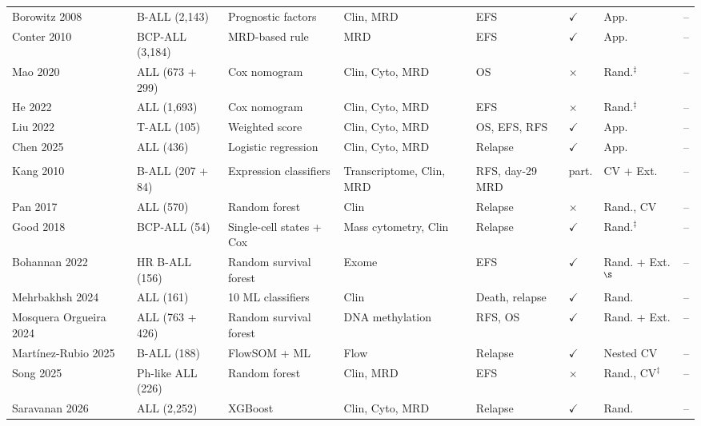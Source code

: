 \documentclass[pdflatex,sn-nature]{sn-jnl}
\begin{document}
\begin{appendices}
\begin{table}
\begin{tabular}{@{}llllllll@{}}
Borowitz 2008~\cite{[CITE:Borowitz2008]} & B-ALL (2,143) & Prognostic factors & Clin, MRD & EFS & $\checkmark$ & App. & -- \\
Conter 2010~\cite{[CITE:Conter2010]} & BCP-ALL (3,184) & MRD-based rule & MRD & EFS & $\checkmark$ & App. & -- \\
Mao 2020~\cite{[CITE:Mao2020]} & ALL (673 + 299) & Cox nomogram & Clin, Cyto, MRD & OS & $\times$ & Rand.$^\ddagger$ & -- \\
He 2022~\cite{[CITE:He2022]} & ALL (1,693) & Cox nomogram & Clin, Cyto, MRD & EFS & $\times$ & Rand.$^\ddagger$ & -- \\
Liu 2022~\cite{[CITE:Liu2022TALL]} & T-ALL (105) & Weighted score & Clin, Cyto, MRD & OS, EFS, RFS & $\checkmark$ & App. & -- \\
Chen 2025~\cite{[CITE:Chen2025FrontPediatr]} & ALL (436) & Logistic regression & Clin, Cyto, MRD & Relapse & $\checkmark$ & App. & -- \\
\addlinespace[2pt]
\multicolumn{8}{@{}l}{\textit{Paediatric ALL: machine-learning and omics models}} \\
Kang 2010~\cite{[CITE:Kang2010]} & B-ALL (207 + 84) & Expression classifiers & Transcriptome, Clin, MRD & RFS, day-29 MRD & part. & CV + Ext. & -- \\
Pan 2017~\cite{[CITE:Pan2017]} & ALL (570) & Random forest & Clin & Relapse & $\times$ & Rand., CV & -- \\
Good 2018~\cite{[CITE:Good2018]} & BCP-ALL (54) & Single-cell states + Cox & Mass cytometry, Clin & Relapse & $\checkmark$ & Rand.$^\ddagger$ & -- \\
Bohannan 2022~\cite{[CITE:Bohannan2022]} & HR B-ALL (156) & Random survival forest & Exome & EFS & $\checkmark$ & Rand. + Ext.$^\S$ & -- \\
Mehrbakhsh 2024~\cite{[CITE:Mehrbakhsh2024]} & ALL (161) & 10 ML classifiers & Clin & Death, relapse & $\checkmark$ & Rand. & -- \\
Mosquera Orgueira 2024~\cite{[CITE:Mosquera2024]} & ALL (763 + 426) & Random survival forest & DNA methylation & RFS, OS & $\checkmark$ & Rand. + Ext. & -- \\
Mart\'inez-Rubio 2025~\cite{[CITE:Martinez2025]} & B-ALL (188) & FlowSOM + ML & Flow & Relapse & $\checkmark$ & Nested CV & -- \\
Song 2025~\cite{[CITE:Song2025]} & Ph-like ALL (226) & Random forest & Clin, MRD & EFS & $\times$ & Rand., CV$^\ddagger$ & -- \\
Saravanan 2026~\cite{[CITE:Saravanan2026]} & ALL (2,252) & XGBoost & Clin, Cyto, MRD & Relapse & $\checkmark$ & Rand. & -- \\

\end{tabular}
\end{table}
\end{appendices}
\end{document}
